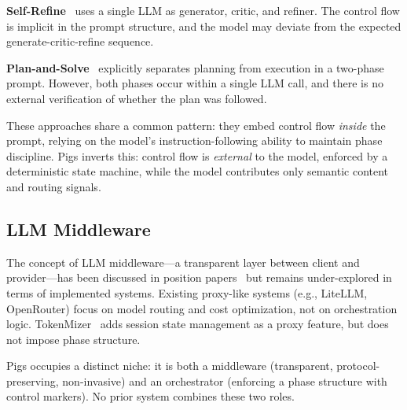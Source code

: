 \textbf{Self-Refine}~\citep{madaan2023selfrefine} uses a single LLM as generator, critic, and refiner. The control flow is implicit in the prompt structure, and the model may deviate from the expected generate-critic-refine sequence.

\textbf{Plan-and-Solve}~\citep{wang2023plan} explicitly separates planning from execution in a two-phase prompt. However, both phases occur within a single LLM call, and there is no external verification of whether the plan was followed.

These approaches share a common pattern: they embed control flow \emph{inside} the prompt, relying on the model's instruction-following ability to maintain phase discipline. Pigs inverts this: control flow is \emph{external} to the model, enforced by a deterministic state machine, while the model contributes only semantic content and routing signals.

\subsection{LLM Middleware}

The concept of LLM middleware---a transparent layer between client and provider---has been discussed in position papers~\citep{dzanic2024middleware} but remains under-explored in terms of implemented systems. Existing proxy-like systems (e.g., LiteLLM, OpenRouter) focus on model routing and cost optimization, not on orchestration logic. TokenMizer~\citep{liu2026tokenmizer} adds session state management as a proxy feature, but does not impose phase structure.

Pigs occupies a distinct niche: it is both a middleware (transparent, protocol-preserving, non-invasive) and an orchestrator (enforcing a phase structure with control markers). No prior system combines these two roles.
